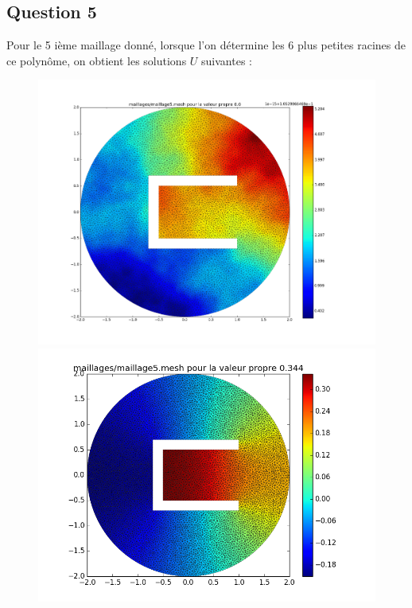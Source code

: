 \documentclass[a4paper,12pt]{article}
\begin{document}
\subsection{Question 5}

Pour le 5 ième maillage donné, lorsque l'on détermine les 6 plus petites racines de ce polynôme, on obtient les solutions $U$ suivantes :

\begin{figure}[H]
\begin{center}
        \includegraphics[scale = 0.15]{image/II/trace_1}
        \includegraphics[scale = 0.3]{image/II/trace_2}

\end{center}
\end{figure}
\end{document}
